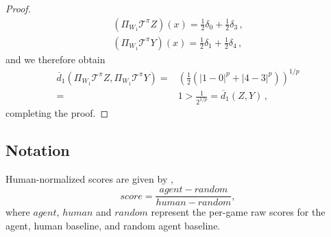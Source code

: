 \documentclass[letterpaper]{article}
\begin{document}
\begin{proof}
\begin{align*}
    (\Pi_{W_1} \mathcal{T}^\pi Z)(x) = \frac{1}{2} \delta_0 + \frac{1}{2} \delta_3 \, ,\\
    (\Pi_{W_1} \mathcal{T}^\pi Y)(x) = \frac{1}{2} \delta_1 + \frac{1}{2} \delta_4 \, ,
\end{align*}
and we therefore obtain
\begin{align*}
\overline{d}_1(\Pi_{W_1} \mathcal{T}^\pi Z, \Pi_{W_1} \mathcal{T}^\pi Y) 
= & \left(\frac{1}{2}(|1-0|^p + |4-3|^p) \right)^{1/p} \\
= & 1 > \frac{1}{2^{1/p}} =  \overline{d}_1(Z, Y) \, ,
\end{align*}
completing the proof.
\end{proof}

\subsection{Notation}
Human-normalized scores are given by \cite{vanhasselt16deep},
\begin{equation}
    \nonumber score = \frac{agent - random}{human - random},
\end{equation}
where $agent$, $human$ and $random$ represent the per-game raw scores for the agent, human baseline, and random agent baseline.
\end{document}
